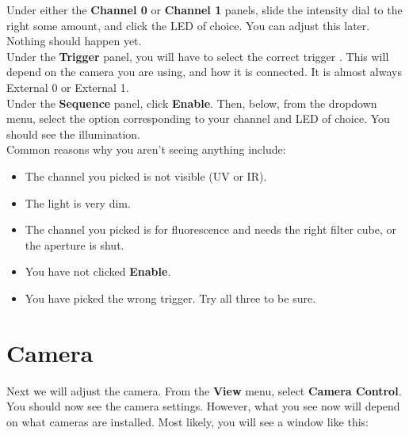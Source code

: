 \documentclass{report}
\begin{document}
Under either the \textbf{Channel 0} or \textbf{Channel 1} panels, slide the intensity dial to the right some amount, and click the LED of choice. You can adjust this later. Nothing should happen yet.\\

Under the \textbf{Trigger} panel, you will have to select the correct trigger \footnotemark[\value{footnote}]. This will depend on the camera you are using, and how it is connected. It is almost always External 0 or External 1.\\

Under the \textbf{Sequence} panel, click \textbf{Enable}. Then, below, from the dropdown menu, select the option corresponding to your channel and LED of choice. You should see the illumination.\\

Common reasons why you aren't seeing anything include:
\begin{itemize}
	\item The channel you picked is not visible (UV or IR).
	\item The light is very dim.
	\item The channel you picked is for fluorescence and needs the right filter cube, or the aperture is shut.
	\item You have not clicked \textbf{Enable}.
	\item You have picked the wrong trigger. Try all three to be sure.
\end{itemize}

\newpage


\section{Camera}

Next we will adjust the camera. From the \textbf{View} menu, select \textbf{Camera Control}.\\

You should now see the camera settings. However, what you see now will depend on what cameras are installed. Most likely, you will see a window like this:
\end{document}
